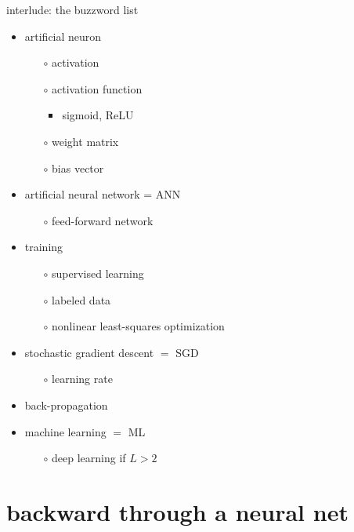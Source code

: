 \documentclass[xcolor={svgnames},
               hyperref={colorlinks,citecolor=DeepPink4,linkcolor=FireBrick,urlcolor=Maroon}]
               {beamer}
\begin{document}
\begin{frame}{interlude: the buzzword list}

\begin{itemize}
\item \alert{artificial neuron}
    \begin{itemize}
    \item[$\circ$] \alert{activation}
    \item[$\circ$] \alert{activation function}
        \begin{itemize}
        \item sigmoid, ReLU
        \end{itemize}
    \item[$\circ$] \alert{weight} matrix
    \item[$\circ$] \alert{bias} vector
    \end{itemize}
\item \alert{artificial neural network} = ANN
    \begin{itemize}
    \item[$\circ$] feed-forward network
    \end{itemize}
\item \alert{training}
    \begin{itemize}
    \item[$\circ$] \alert{supervised learning}
    \item[$\circ$] labeled data
    \item[$\circ$] nonlinear least-squares optimization
    \end{itemize}
\item \alert{stochastic gradient descent} $=$ SGD
    \begin{itemize}
    \item[$\circ$] learning rate
    \end{itemize}
\item \alert{back-propagation}

\hspace{-7mm} \hrulefill
\item \alert{machine learning} $=$ ML
    \begin{itemize}
    \item[$\circ$] \alert{deep learning} if $L>2$
    \end{itemize}
\end{itemize}
\end{frame}


\section{backward through a neural net}
\end{document}
